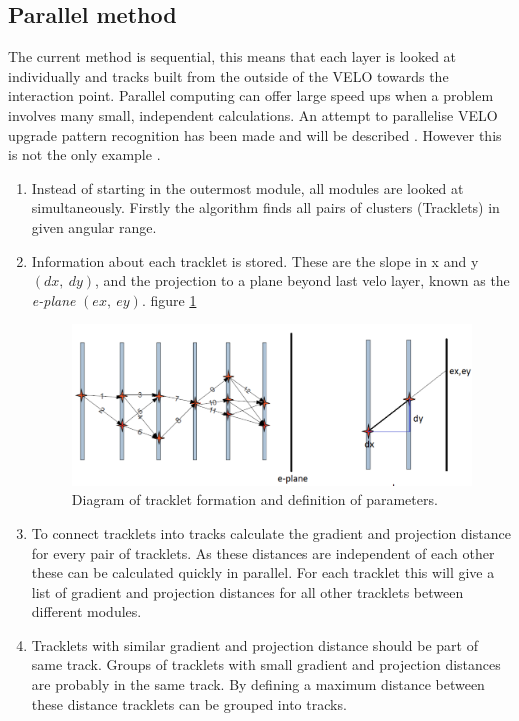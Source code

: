 \subsection{Parallel method}
The current method is sequential, this means that each layer is looked at individually and tracks built from the outside of the VELO towards the interaction point. Parallel computing can offer large speed ups when a problem involves many small, independent calculations. An attempt to parallelise VELO upgrade pattern recognition has been made and will be described \cite{Ticse:1554078}. However this is not the only example \cite{Abba:1667587}.
\begin{enumerate}
    \item Instead of starting in the outermost module, all modules are looked at simultaneously. Firstly the algorithm finds all pairs of clusters (Tracklets) in given angular range.
    \item Information about each tracklet is stored. These are the slope in x and y $(dx,\ dy)$, and the projection to a plane beyond last velo layer, known as the \textit{e-plane} $(ex,\ ey)$. figure \ref{fig:SIMDVeloPR}
    
    \begin{figure}[h] %
    \centering 
    \includegraphics[width=\textwidth]{SIMDVeloPR}
    \caption{Diagram of tracklet formation and definition of parameters.} 
    \label{fig:SIMDVeloPR} 
    \end{figure}

    \item To connect tracklets into tracks calculate the gradient and projection distance for every pair of tracklets. As these distances are independent of each other these can be calculated  quickly in parallel. For each tracklet this will give a list of gradient and projection distances for all other tracklets between different modules. 
    \item Tracklets with similar gradient and projection distance should be part of same track. Groups of tracklets with small gradient and projection distances are probably in the same track. By defining a maximum distance between these distance tracklets can be grouped into tracks.
\end{enumerate}
